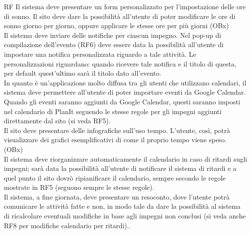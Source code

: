\begin {mylist} {RF}
    Il sistema deve presentare un form personalizzato per l'impostazione delle ore
    di sonno. Il sito deve dare la possibilità all'utente di poter modificare le ore 
    di sonno giorno per giorno, oppure applicare le stesse ore per più giorni (OBx)
     \\
    Il sistema deve inviare delle notifiche per ciascun impegno. Nel pop-up
    di compilazione dell'evento (RF6) deve essere data la possibilità all'utente
    di impostare una notifica personalizzata riguardo a tale attività.
    Le personalizzazioni riguardano: quando ricevere tale notifica e il titolo di questa, per 
    default quest'ultimo sarà il titolo dato all'evento.
     \\
    In quanto è un'applicazione molto diffusa tra gli utenti che utilizzano calendari,
    il sistema deve permettere all'utente di poter importare eventi da Google Calendar. 
    Quando gli eventi saranno aggiunti da Google Calendar, questi saranno
    imposti nel calendario di PlanIt seguendo le stesse regole per gli impegni 
    aggiunti direttamente dal sito (si veda RF5).
     \\
    Il sito deve presentare delle infografiche sull'uso tempo. L'utente, così, potrà
    visualizzare dei grafici esemplificativi di come il proprio tempo viene speso. 
    (OBx)
     \\
    Il sistema deve riorganizzare automaticamente il calendario in caso di ritardi sugli 
    impegni; sarà data la possibilità all'utente di notificare il sistema di ritardi e 
    a quel punto il sito dovrò ripianificare il calendario, sempre secondo le regole mostrate
    in RF5 (seguono sempre le stesse regole).  
     \\
    Il sistema, a fine giornata, deve presentare un resoconto, dove l'utente potrà
    comunicare le attività fatte e non, in modo tale da dare la possibilità al sistema di 
    ricalcolare eventuali modifiche in base agli impegni non conclusi (si veda
    anche RF8 per modifiche calendario per ritardi)..
    



\end{mylist}